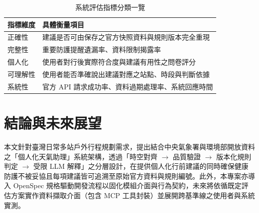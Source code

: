 \documentclass[conference]{IEEEtran}
\begin{document}
\begin{table}[t]
  \centering
  \caption{系統評估指標分類一覽}
  \label{tab:evaluation_metrics}
  \begin{tabularx}{\columnwidth}{@{}l X@{}}
    \toprule
    \textbf{指標維度} & \textbf{具體衡量項目} \\
    \midrule
    正確性 & 建議是否可由保存之官方快照資料與規則版本完全重現 \\
    完整性 & 重要防護提醒遺漏率、資料限制揭露率 \\
    個人化 & 使用者對行後實際符合度與建議有用性之問卷評分 \\
    可理解性 & 使用者能否準確說出建議對應之站點、時段與判斷依據 \\
    系統性 & 官方 API 請求成功率、資料過期處理率、系統回應時間 \\
    \bottomrule
  \end{tabularx}
\end{table}

\section{結論與未來展望}

本文針對臺灣日常多站戶外行程規劃需求，提出結合中央氣象署與環境部開放資料之「個人化天氣助理」系統架構，透過「時空對齊 $\rightarrow$ 品質驗證 $\rightarrow$ 版本化規則判定 $\rightarrow$ 受限 LLM 解釋」之分層設計，在提供個人化行前建議的同時確保健康防護不被妥協且每項建議皆可追溯至原始官方資料與規則編號。此外，本專案亦導入 OpenSpec 規格驅動開發流程以固化模組介面與行為契約，未來將依循既定評估方案實作資料擷取介面（包含 MCP 工具封裝）並展開跨基準線之使用者與系統實測。



\end{document}
